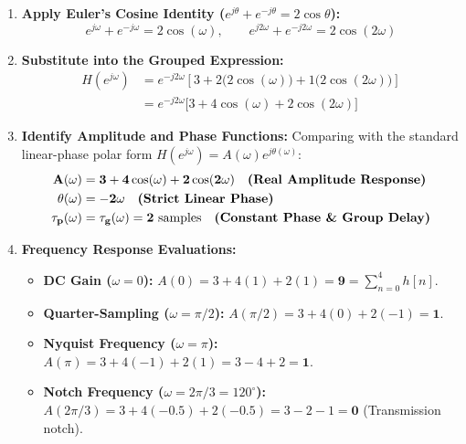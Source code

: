 \documentclass[11pt,a4paper]{article}
\begin{document}
\begin{enumerate}
    \item \textbf{Apply Euler's Cosine Identity ($e^{j\theta} + e^{-j\theta} = 2\cos\theta$):}
    \begin{equation}
    e^{j\omega} + e^{-j\omega} = 2\cos(\omega), \qquad e^{j2\omega} + e^{-j2\omega} = 2\cos(2\omega)
    \end{equation}

    \item \textbf{Substitute into the Grouped Expression:}
    \begin{align}
    H(e^{j\omega}) &= e^{-j2\omega} \left[ 3 + 2\big(2\cos(\omega)\big) + 1\big(2\cos(2\omega)\big) \right] \nonumber \\
    &= e^{-j2\omega} \big[ 3 + 4\cos(\omega) + 2\cos(2\omega) \big]
    \end{align}

    \item \textbf{Identify Amplitude and Phase Functions:}
    Comparing with the standard linear-phase polar form $H(e^{j\omega}) = A(\omega) e^{j\theta(\omega)}$:
    \begin{align}
    \mathbf{A(\omega)} &= \mathbf{3 + 4\cos(\omega) + 2\cos(2\omega)} \quad \text{\textbf{(Real Amplitude Response)}} \\
    \mathbf{\theta(\omega)} &= \mathbf{-2\omega} \quad \text{\textbf{(Strict Linear Phase)}} \\
    \mathbf{\tau_p(\omega)} &= \mathbf{\tau_g(\omega) = 2 \text{ samples}} \quad \text{\textbf{(Constant Phase \& Group Delay)}}
    \end{align}

    \item \textbf{Frequency Response Evaluations:}
    \begin{itemize}
        \item \textbf{DC Gain ($\omega = 0$):} $A(0) = 3 + 4(1) + 2(1) = \mathbf{9} = \sum_{n=0}^4 h[n]$.
        \item \textbf{Quarter-Sampling ($\omega = \pi/2$):} $A(\pi/2) = 3 + 4(0) + 2(-1) = \mathbf{1}$.
        \item \textbf{Nyquist Frequency ($\omega = \pi$):} $A(\pi) = 3 + 4(-1) + 2(1) = 3 - 4 + 2 = \mathbf{1}$.
        \item \textbf{Notch Frequency ($\omega = 2\pi/3 = 120^\circ$):}
        $A(2\pi/3) = 3 + 4(-0.5) + 2(-0.5) = 3 - 2 - 1 = \mathbf{0}$ (Transmission notch).
    \end{itemize}
\end{enumerate}
\end{document}

